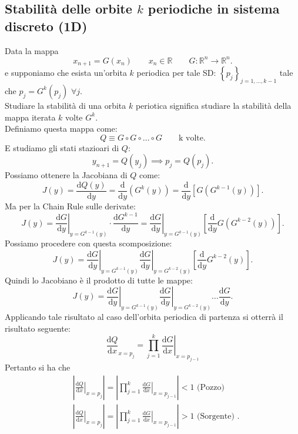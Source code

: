 \subsection{Stabilità delle orbite $k$ periodiche in sistema discreto (1D)}%
Data la mappa 
\[
    x_{n+1}= G(x_n) \qquad  x_n \in \mathbb{R} \qquad  G:\mathbb{R}^n\to \mathbb{R}^n
.\] 
e supponiamo che esista un'orbita $k$  periodica per tale SD: $\left\{p_j\right\}_{j = 1, \ldots, k-1}$  tale che $p_j = G^k(p_j)$ $\forall j$.\\
Studiare la stabilità di una orbita $k$  periotica significa studiare la stabilità della mappa iterata $k$  volte $G^k$.\\
Definiamo questa mappa come:
\[
    Q \equiv G \circ G \circ \ldots \circ G \qquad  \text{k volte}
.\] 
E studiamo gli stati stazioari di $Q$:
\[
    y_{n+1} = Q(y_j) \implies  p_j = Q (p_j) 
.\] 
Possiamo ottenere la Jacobiana di $Q$  come:
\[
    J(y) = \frac{\text{d} Q(y) }{\text{d} y} = \frac{\text{d} }{\text{d} y} (G^k(y)) 
    = \frac{\text{d} }{\text{d} y} \left[G(G^{k-1}(y) ) \right] 
.\] 
Ma per la Chain Rule sulle derivate:
\[
    J(y) = \left.\frac{\text{d} G}{\text{d} y}\right|_{y = G^{k-1}(y)} \cdot \frac{\text{d} G^{k-1}}{\text{d} y} =
    \left.\frac{\text{d} G}{\text{d} y}\right|_{y = G^{k-1}(y) } \left[\frac{\text{d} }{\text{d} y}G(G^{k-2}(y) )  \right]
.\] 
Possiamo procedere con questa scomposizione:
\[
    J(y) = 
    \left.\frac{\text{d} G}{\text{d} y}\right|_{y = G^{k-1}(y) } 
	\left.\frac{\text{d} G}{\text{d} y}\right|_{y=G^{k-2}(y) }\left[\frac{\text{d} }{\text{d} y}G^{k-2}(y) \right]
.\] 
Quindi lo Jacobiano è il prodotto di tutte le mappe:
\[
    J(y) = 
    \left.\frac{\text{d} G}{\text{d} y}\right|_{y = G^{k-1}(y) } \left.\frac{\text{d} G}{\text{d} y}\right|_{y=G^{k-2}(y) }\ldots 
    \frac{\text{d} G}{\text{d} y}
.\] 
Applicando tale risultato al caso dell'orbita periodica di partenza si otterrà il risultato seguente:
\[
    \frac{\text{d} Q}{\text{d} x}_{x=p_j} = \prod_{j=1}^{k} \left.\frac{\text{d} G}{\text{d} x}\right|_{x=p_{j-1}} 
\] 
Pertanto si ha che
\[\begin{aligned}
    &\left|\left.\frac{\text{d} Q}{\text{d} x}\right|_{x=p_j}\right| =
	\left| \prod_{j=1}^{k} \left.\frac{\text{d} G}{\text{d} x}\right|_{x=p_{j-1}} \right| < 1  \text{ (Pozzo)  }\\
    &\left|\left.\frac{\text{d} Q}{\text{d} x}\right|_{x=p_j}\right| = 
	\left|\prod_{j=1}^{k} \left.\frac{\text{d} G}{\text{d} x}\right|_{x=p_{j-1}} \right| > 1  \text{ (Sorgente)  }
.\end{aligned}\]
